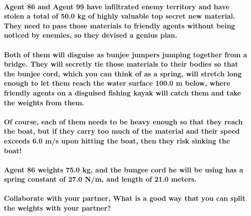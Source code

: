 \paragraph{Agent 86 and Agent 99 have infiltrated enemy territory and have stolen a total of 50.0 kg of highly valuable top secret new material. They need to pass those materials to friendly agents without being noticed by enemies, so they devised a genius plan.\newline}
\paragraph{Both of them will disguise as bunjee jumpers jumping together from a bridge. They will secretly tie those materials to their bodies so that the bunjee cord, which you can think of as a spring, will stretch long enough to let them reach the water surface 100.0 m below, where friendly agents on a disguised fishing kayak will catch them and take the weights from them.\newline}
\paragraph{Of course, each of them needs to be heavy enough so that they reach the boat, but if they carry too much of the material and their speed exceeds 6.0 m/s upon hitting the boat, then they risk sinking the boat!\newline}
\paragraph{Agent 86 weights 75.0 kg, and the bungee cord he will be using has a spring constant of 27.0 N/m, and length of 21.0 meters.\newline}
\paragraph{Collaborate with your partner, What is a good way that you can split the weights with your partner?}
